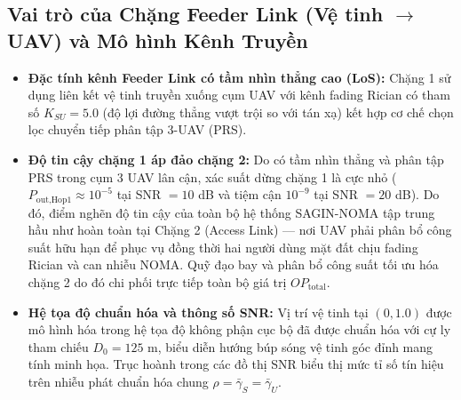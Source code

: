 \subsection*{Vai trò của Chặng Feeder Link (Vệ tinh $\to$ UAV) và Mô hình Kênh Truyền}
\begin{itemize}[leftmargin=1.5em]
    \item \textbf{Đặc tính kênh Feeder Link có tầm nhìn thẳng cao (LoS):} Chặng 1 sử dụng liên kết vệ tinh truyền xuống cụm UAV với kênh fading Rician có tham số $K_{SU} = 5.0$ (độ lợi đường thẳng vượt trội so với tán xạ) kết hợp cơ chế chọn lọc chuyển tiếp phân tập 3-UAV (PRS). 
    \item \textbf{Độ tin cậy chặng 1 áp đảo chặng 2:} Do có tầm nhìn thẳng và phân tập PRS trong cụm 3 UAV lân cận, xác suất dừng chặng 1 là cực nhỏ ($P_{\text{out}, \text{Hop1}} \approx 10^{-5}$ tại SNR $= 10$ dB và tiệm cận $10^{-9}$ tại SNR $= 20$ dB). Do đó, điểm nghẽn độ tin cậy của toàn bộ hệ thống SAGIN-NOMA tập trung hầu như hoàn toàn tại Chặng 2 (Access Link) — nơi UAV phải phân bổ công suất hữu hạn để phục vụ đồng thời hai người dùng mặt đất chịu fading Rician và can nhiễu NOMA. Quỹ đạo bay và phân bổ công suất tối ưu hóa chặng 2 do đó chi phối trực tiếp toàn bộ giá trị $OP_{\text{total}}$.
    \item \textbf{Hệ tọa độ chuẩn hóa và thông số SNR:} Vị trí vệ tinh tại $(0, 1.0)$ được mô hình hóa trong hệ tọa độ không phận cục bộ đã được chuẩn hóa với cự ly tham chiếu $D_0 = 125$ m, biểu diễn hướng búp sóng vệ tinh góc đỉnh mang tính minh họa. Trục hoành trong các đồ thị SNR biểu thị mức tỉ số tín hiệu trên nhiễu phát chuẩn hóa chung $\rho = \bar{\gamma}_S = \bar{\gamma}_U$.
\end{itemize}

